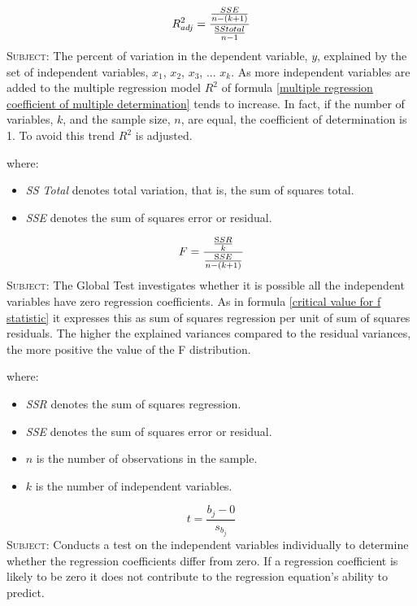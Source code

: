 \begin{equation}
\label{multiple regression adjusted coefficient of multiple determination}
R^2_{adj} = \frac{\frac{SSE}{n-(k+1)}}{\frac{\text SS total}{n-1}}
\end{equation}
\textsc{Subject:} The percent of variation in the dependent variable, $y$, explained by the set of independent variables, $x_{1}$, $x_{2}$, $x_{3}$, ... $x_{k}$. As more independent variables are added to the multiple regression model $R^2$ of formula \eqref{multiple regression coefficient of multiple determination} tends to increase. In fact, if the number of variables, $k$, and the sample size, $n$, are equal, the coefficient of determination is 1. To avoid this trend $R^2$ is adjusted. 

where:
\begin{itemize}
 \item \emph{SS Total} denotes total variation, that is, the sum of squares total.
 \item \emph{SSE} denotes the sum of squares error or residual.
\end{itemize}
\hformbar


\begin{equation}
\label{multiple regression global test}
F = \frac{\frac{\text SSR}{k}}{\frac{\text SSE}{n-(k+1)}}
\end{equation}
\textsc{Subject:} The Global Test investigates whether it is possible all the independent variables have zero regression coefficients. As in formula \eqref{critical value for f statistic} it expresses this as sum of squares regression per unit of sum of squares residuals. The higher the explained variances compared to the residual variances, the more positive the value of the F distribution.

where:
\begin{itemize}
 \item \emph{SSR} denotes the sum of squares regression.
 \item \emph{SSE} denotes the sum of squares error or residual.
 \item $n$ is the number of observations in the sample.
 \item $k$ is the number of independent variables.
\end{itemize}
\hformbar


\begin{equation}
\label{multiple regression t test individual coefficients}
t = \frac{b_{j} - 0}{s_{b_{j}}}	
\end{equation}
\textsc{Subject:} Conducts a test on the independent variables individually to determine whether the regression coefficients differ from zero. If a regression coefficient is likely to be zero it does not contribute to the regression equation's ability to predict. 

